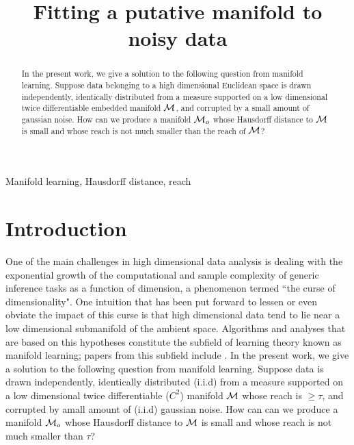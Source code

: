 \documentclass[final, 12pt]{colt2018} %
\title[Manifold fitting]{Fitting a putative manifold to noisy data}
\begin{document}
\maketitle

\begin{abstract}
In the present work,  we give a solution to the following  question from manifold learning. 
Suppose data belonging to a high dimensional Euclidean space is drawn independently, identically distributed  from a measure supported on a low dimensional twice  differentiable embedded manifold $\mathcal M$, and corrupted by a small amount of  gaussian noise.
How can we produce a manifold $\mathcal M_o$ whose Hausdorff distance to $\mathcal M$ is small and whose reach is not much smaller than the reach of $\mathcal M$?
\end{abstract}

\begin{keywords}
Manifold learning, Hausdorff distance, reach
\end{keywords}



\section{Introduction}
One of the main challenges in high dimensional data analysis is dealing with the exponential growth of the computational and sample complexity of generic inference tasks as a function of dimension, a phenomenon termed ``the curse of dimensionality". One intuition that has been put forward to lessen or even obviate the impact of this curse is that high dimensional data tend to lie near a low dimensional submanifold of the ambient space. Algorithms and analyses that are based on this hypotheses constitute the  subfield of learning theory known as manifold learning; papers from this subfield include
\cite{misha, Carlsson, Dasgupta2, donoho, recons, FMN,  Wasserman, Wasserman3, kegl, NarNiy, NSW, LLE, PrincipalManifolds, ISOMAP, MaximumVariance}.
In the present work,  we give a solution to the following  question from manifold learning. 
Suppose data is drawn independently, identically distributed (i.i.d) from a measure supported on a low dimensional twice  differentiable ($C^2$) manifold $\mathcal M$ whose reach is $\geq \tau$, and corrupted by amall amount of (i.i.d) gaussian noise.
How can can we produce a manifold $\mathcal M_o$ whose Hausdorff distance to $\mathcal M$ is small and whose reach is not much smaller than $\tau$? 
\end{document}
